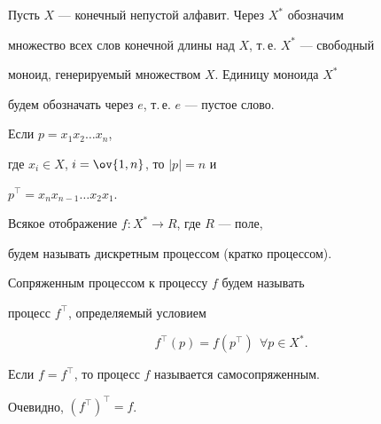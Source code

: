 \label{begin}








Пусть $X$ --- конечный непустой алфавит. Через $X^*$ обозначим


множество всех слов конечной длины над $X$, т.\,е. $X^*$ --- свободный 


моноид, генерируемый множеством $X$. Единицу моноида $X^*$


будем обозначать через $e$, т.\,е. $e$ --- пустое слово.


Если $p=x_1x_2\dotsc x_n$,


где $x_i\in X$, $i=\ov{1,n}$, то $|p|=n$ и


$p^\top=x_n x_{n-1}\dotsc x_2x_1$.





\begin{defn}


Всякое отображение $f:X^*\to R$, где $R$ --- поле,


будем называть дискретным процессом (кратко процессом).


\end{defn}





\begin{defn}


Сопряженным процессом к процессу $f$ будем называть 


процесс $f^\top$, определяемый условием


$$


f^\top(p)=f(p^\top)\ \ \forall p\in X^*.


$$


\end{defn}





\begin{defn}


Если $f=f^\top$, то процесс $f$ называется самосопряженным.


\end{defn}





\begin{note}


Очевидно, $(f^\top)^\top=f$.


\end{note}





